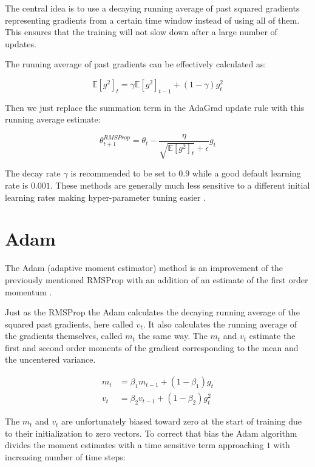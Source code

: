 \documentclass[12pt, titlepage]{article}
\begin{document}
The central idea is to use a decaying running average of past squared gradients representing gradients from a certain time window instead of using all of them. This ensures that the training will not slow down after a large number of updates.

The running average of past gradients can be effectively calculated as:

\begin{equation}\label{eq:running_avg}
\mathbb{E}[g^2]_t = \gamma \mathbb{E}[g^2]_{t-1} + (1 - \gamma) g_t^2
\end{equation}

Then we just replace the summation term in the AdaGrad update rule with this running average estimate:

\begin{equation}\label{eq:rmsprop_update}
\theta_{t+1}^{RMSProp} = \theta_{t} - \frac{\eta}{\sqrt{\mathbb{E}[g^2]_t} + \epsilon} g_{t}
\end{equation}

The decay rate $\gamma$ is recommended to be set to $0.9$ while a good default learning rate is $0.001$. These methods are generally much less sensitive to a different initial learning rates making hyper-parameter tuning easier \cite{zeiler2012adadelta}.

\section{Adam}
The Adam (adaptive moment estimator) method is an improvement of the previously mentioned RMSProp with an addition of an estimate of the first order momentum \cite{kingma2014adam}.

Just as the RMSProp the Adam calculates the decaying running average of the squared past gradients, here called $v_t$. It also calculates the running average of the gradients themselves, called $m_t$ the same way. The $m_t$ and $v_t$ estimate the first and second order moments of the gradient corresponding to the mean and the uncentered variance.

\begin{equation}\label{eq:adam_moments}
\begin{aligned}
m_t &= \beta_1 m_{t-1} + (1 - \beta_1) g_t\\
v_t &= \beta_2 v_{t-1} + (1 - \beta_2) g_t^2
\end{aligned}
\end{equation}

The $m_t$ and $v_t$ are unfortunately biased toward zero at the start of training due to their initialization to zero vectors. To correct that bias the Adam algorithm divides the moment estimates with a time sensitive term approaching $1$ with increasing number of time steps:
\end{document}
